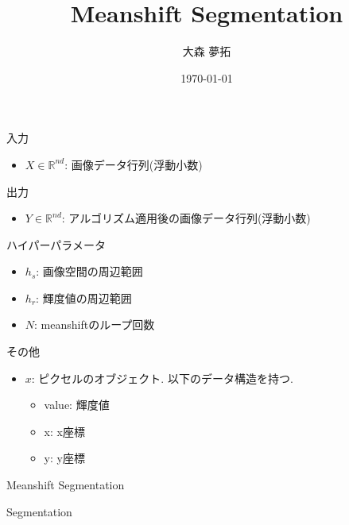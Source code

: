 \documentclass[a4paper]{ujarticle} %
\title{Meanshift Segmentation} %
\date{\today}
\author{大森 夢拓}
\begin{document}
	入力
	\begin{itemize}
		\item $X \in \mathbb{R}^{nd}$: 画像データ行列(浮動小数)
	\end{itemize}
	出力
	\begin{itemize}
		\item $Y \in \mathbb{R}^{nd}$: アルゴリズム適用後の画像データ行列(浮動小数)
	\end{itemize}
	ハイパーパラメータ
	\begin{itemize}
		\item $h_s$: 画像空間の周辺範囲
		\item $h_r$: 輝度値の周辺範囲
		\item $N$: meanshiftのループ回数
	\end{itemize}
	その他
	\begin{itemize}
		\item $x$: ピクセルのオブジェクト. 以下のデータ構造を持つ.
		\begin{itemize}
			\item value: 輝度値
			\item x: x座標
			\item y: y座標
		\end{itemize}
	\end{itemize}

	\begin{algorithm}[H]
		\caption{Meanshift Segmentation}
		\label{alg:mss}
		\begin{algorithmic}[1]
			\EndFunction
		\end{algorithmic}
	\end{algorithm}
	
	\begin{algorithm}[H]
		\caption{Segmentation}
		\label{alg:s}
		\begin{algorithmic}[1]
					 
				\EndFor
			\EndFunction
		\end{algorithmic}
	\end{algorithm}
\end{document}
